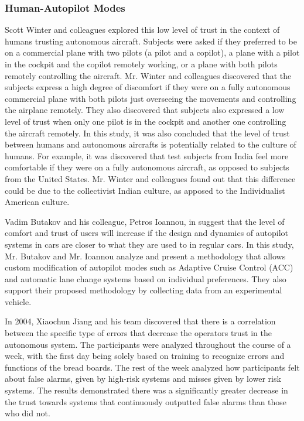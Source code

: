 \documentclass[runningheads,a4paper]{llncs}
\begin{document}
\subsubsection{Human-Autopilot Modes}
Scott Winter and colleagues \cite{winter2015indian} explored this low level of trust in the context of humans trusting autonomous aircraft. Subjects were asked if they preferred to be on a commercial plane with two pilots (a pilot and a copilot), a plane with a pilot in the cockpit and the copilot remotely working, or a plane with both pilots remotely controlling the aircraft. Mr. Winter and colleagues discovered that the subjects express a high degree of discomfort if they were on a fully autonomous commercial plane with both pilots just overseeing the movements and controlling the airplane remotely. They also discovered that subjects also expressed a low level of trust when only one pilot is in the cockpit and another one controlling the aircraft remotely. In this study, it was also concluded that the level of trust between humans and autonomous aircrafts is potentially related to the culture of humans. For example, it was discovered that test subjects from India feel more comfortable if they were on a fully autonomous aircraft, as opposed to subjects from the United States. Mr. Winter and colleagues found out that this difference could be due to the collectivist Indian culture, as apposed to the Individualist American culture.

Vadim Butakov and his colleague, Petros Ioannou, in \cite{butakov2015driving} suggest that the level of comfort and trust of users will increase if the design and dynamics of autopilot systems in cars are closer to what they are used to in regular cars. In this study, Mr. Butakov and Mr. Ioannou analyze and present a methodology that allows custom modification of autopilot modes such as  Adaptive Cruise Control (ACC) and automatic lane change systems based on individual preferences. They also support their proposed methodology by collecting data from an experimental vehicle.

In 2004, Xiaochun Jiang and his team discovered that there is a correlation between the specific type of errors that decrease the operators trust in the autonomous system\cite{jiang2004measurement}.  The participants were analyzed throughout the course of a week, with the first day being solely based on training to recognize errors and functions of the bread boards.  The rest of the week analyzed how participants felt about false alarms, given by high-risk systems and misses given by lower risk systems.  The results demonstrated there was a significantly greater decrease in the trust towards systems that continuously outputted false alarms than those who did not.
\end{document}
